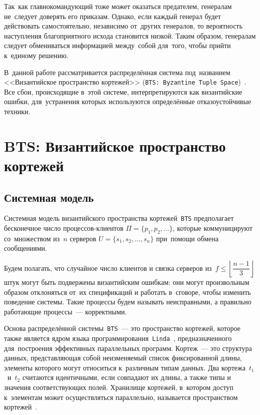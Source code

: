 Так~как главнокомандующий тоже может оказаться предателем, генералам не~следует доверять его приказам. Однако, если каждый генерал будет действовать самостоятельно, независимо от~других генералов, то вероятность наступления благоприятного исхода становится низкой. Таким образом, генералам следует обмениваться информацией между~собой для~того, чтобы прийти к~единому решению.

В~данной работе рассматривается распределённая система под~названием <<Византийское пространство кортежей>> (\texttt{BTS: Byzantine Tuple Space})~\autocite{bts}. Все сбои, происходящие в~этой системе, интерпретируются как византийские ошибки, для~устранения которых используются определённые отказоустойчивые техники. 


\section{BTS: Византийское пространство кортежей}\label{sec:2}
\subsection{Системная модель}\label{subsec:1}
Системная модель византийского пространства кортежей~\texttt{BTS} предполагает бесконечное число процессов-клиентов $\Pi = \{p_1, p_2, \dots\}$, которые коммуницируют со~множеством из~$n$ серверов $U = \{s_1, s_2, \dots, s_n\}$ при~помощи обмена сообщениями.

Будем полагать, что случайное число клиентов и связка серверов из~$f \leqslant \left\lfloor \dfrac{n-1}{3} \right\rfloor$ штук могут быть подвержены византийским ошибкам: они могут произвольным образом отклоняться от~их спецификаций и работать в~сговоре, чтобы изменить поведение системы. Такие процессы будем называть неисправными, а правильно работающие процессы~--- корректными.

Основа распределённой системы~\texttt{BTS}~--- это пространство кортежей, которое также является ядром языка программирования~\texttt{Linda}~\autocite{linda}, предназначенного для~построения эффективных параллельных программ. Кортеж~--- это структура данных, представляющая собой неизменяемый список фиксированной длины, элементы которого могут относиться к~различным типам данных. Два кортежа~$t_1$~и~$t_2$ считаются идентичными, если совпадают их длины, а также типы и значения соответствующих полей. Хранилище кортежей, в~котором доступ к~элементам может осуществляться параллельно, называется пространством кортежей~\autocite{tuplespace}.

